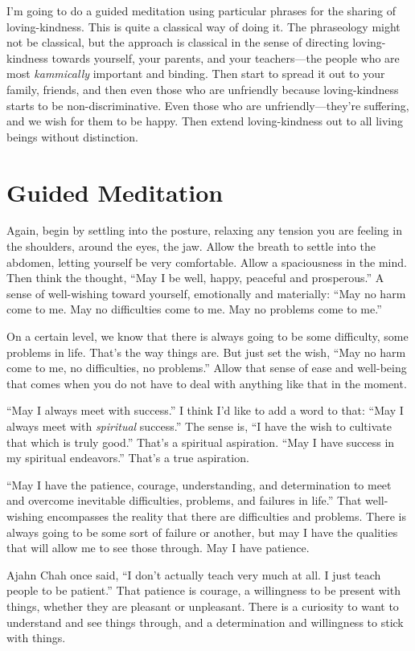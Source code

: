 I’m going to do a guided meditation using particular phrases for the
sharing of loving-kindness. This is quite a classical way of doing it.
The phraseology might not be classical, but the approach is classical in
the sense of directing loving-kindness towards yourself, your parents,
and your teachers—the people who are most \emph{kammically} important
and binding. Then start to spread it out to your family, friends, and
then even those who are unfriendly because loving-kindness starts to be
non-discriminative. Even those who are unfriendly—they’re suffering, and
we wish for them to be happy. Then extend loving-kindness out to all
living beings without distinction.

\section{Guided Meditation}

Again, begin by settling into the posture, relaxing any tension you are
feeling in the shoulders, around the eyes, the jaw. Allow the breath to
settle into the abdomen, letting yourself be very comfortable. Allow a
spaciousness in the mind. Then think the thought, “May I be well, happy,
peaceful and prosperous.” A sense of well-wishing toward yourself,
emotionally and materially: “May no harm come to me. May no difficulties
come to me. May no problems come to me.”

On a certain level, we know that there is always going to be some
difficulty, some problems in life. That’s the way things are. But just
set the wish, “May no harm come to me, no difficulties, no problems.”
Allow that sense of ease and well-being that comes when you do not have
to deal with anything like that in the moment.

“May I always meet with success.” I think I’d like to add a word to
that: “May I always meet with \emph{spiritual} success.” The sense is,
“I have the wish to cultivate that which is truly good.” That’s a
spiritual aspiration. “May I have success in my spiritual endeavors.”
That’s a true aspiration.

“May I have the patience, courage, understanding, and determination to
meet and overcome inevitable difficulties, problems, and failures in
life.” That well-wishing encompasses the reality that there are
difficulties and problems. There is always going to be some sort of
failure or another, but may I have the qualities that will allow me to
see those through. May I have patience.

Ajahn Chah once said, “I don’t actually teach very much at all. I just
teach people to be patient.” That patience is courage, a willingness to
be present with things, whether they are pleasant or unpleasant. There
is a curiosity to want to understand and see things through, and a
determination and willingness to stick with things.

